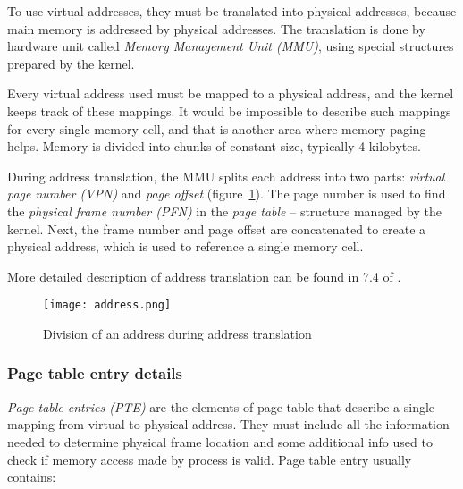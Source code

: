 To use virtual addresses, they must be translated into physical addresses, because main memory is addressed by physical addresses.
The translation is done by hardware unit called {\it Memory Management Unit (MMU)}, using special structures prepared by the kernel.

Every virtual address used must be mapped to a physical address, and the kernel keeps track of these mappings.
It would be impossible to describe such mappings for every single memory cell, and that is another area where memory paging helps.
Memory is divided into chunks of constant size, typically 4 kilobytes.

During address translation, the MMU splits each address into two parts: {\it virtual page number (VPN)} and {\it page offset} (figure~\ref{fig:address}).
The page number is used to find the {\it physical frame number (PFN)} in the {\it page table} -- structure managed by the kernel.
Next, the frame number and page offset are concatenated to create a physical address, which is used to reference a single memory cell.

More detailed description of address translation can be found in 7.4 of \cite{silberschatz}.

\begin{figure}
  \centering
  \texttt{[image: address.png]}
  \caption{Division of an address during address translation \cite{silberschatz}}
  \label{fig:address}
\end{figure}

\subsubsection{Page table entry details}


{\it Page table entries (PTE)} are the elements of page table that describe a single mapping from virtual to physical address.
They must include all the information needed to determine physical frame location and some additional info used to check if memory access made by process is valid.
Page table entry usually contains:

